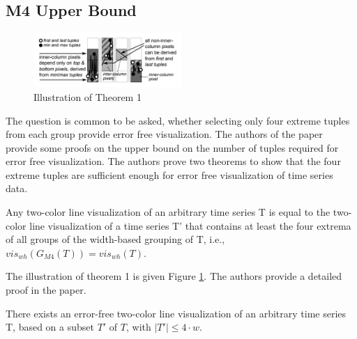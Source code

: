 \subsection{M4 Upper Bound}
\begin{figure}[h]
	\includegraphics[width=0.5\textwidth]{th1}
	\caption{Illustration of Theorem 1}   
	\label{fig:3}
\end{figure}
The question is common to be asked, whether selecting only four extreme tuples from each group provide error free visualization. The authors of the paper provide some proofs on the upper bound on the number of tuples required for error free visualization. The authors prove two theorems to show that the four extreme tuples are sufficient enough for error free visualization of time series data. 
\begin{theorem}
	Any two-color line visualization of an arbitrary
	time series T is equal to the two-color line visualization
	of a time series T'
	that contains at least the
	four extrema of all groups of the width-based grouping
	of T, i.e., $vis_{wh}(G_{M4}(T)) = vis_{wh}(T)$.
\end{theorem}
The illustration of theorem 1 is given Figure \ref{fig:3}.  The authors provide a detailed proof in the paper.

\begin{theorem}
	There exists an error-free two-color line visualization
	of an arbitrary time series T, based on a
	subset $T'$ of $T$, with $|T'| \leq 4 · w$.
\end{theorem}
